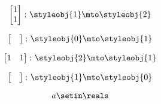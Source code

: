 \begin{forslides}
    \begin{equation}
        \label{eq:parallelism-111}
\begin{bmatrix}
            1  \\
            1  
        \end{bmatrix}  
        \colon \styleobj{1} \mto \styleobj{2}
        \end{equation}

    \begin{equation}
        \label{eq:parallelism-112}
        \begin{bmatrix}
            \quad
        \end{bmatrix} 
        \colon \styleobj{0} \mto \styleobj{1}
    \end{equation}

    \begin{equation}
        \label{eq:parallelism-113}
        \begin{bmatrix}
            1  & 1 
        \end{bmatrix} 
        \colon \styleobj{2} \mto \styleobj{1}
    \end{equation}

    \begin{equation}
        \label{eq:parallelism-114}
        \begin{bmatrix}
            \quad
        \end{bmatrix} 
        \colon \styleobj{1} \mto \styleobj{0}
    \end{equation}

    \begin{equation}
        \label{eq:parallelism-115}
        a \setin \reals
    \end{equation}

\begin{comment}
    \begin{equation}
        \label{eq:parallelism-116}
        \styleelements{x}\setin \setA\setintersection \setB
    \end{equation}

    \begin{equation}
        \label{eq:parallelism-117}
        \mapa(\styleelements{x})
    \end{equation}

    \begin{equation}
        \label{eq:parallelism-118}
        \mapb(\styleelements{x})
    \end{equation}

    \begin{equation}
        \label{eq:parallelism-119}
        \setA,\setB\setin \Obof\Rel
    \end{equation}


\end{comment}
\end{forslides}
